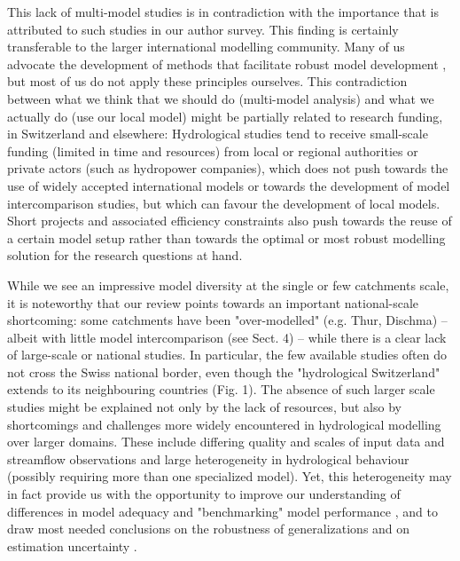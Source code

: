 \documentclass[10pt,a4paper]{article}
\begin{document}
This lack of multi-model studies is in contradiction with the importance that is attributed to such studies in our author survey. This finding is certainly transferable to the larger international modelling community. Many of us advocate the development of methods that facilitate robust model development \citep{Zheng2018}, but most of us do not apply these principles ourselves. This contradiction between what we think that we should do (multi-model analysis) and what we actually do (use our local model) might be partially related to research funding, in Switzerland and elsewhere: Hydrological studies tend to receive small-scale funding (limited in time and resources) from local or regional authorities or private actors (such as hydropower companies), which does not push towards the use of widely accepted international models or towards the development of model intercomparison studies, but which can favour the development of local models. Short projects and associated efficiency constraints also push towards the reuse of a certain model setup rather than towards the optimal or most robust modelling solution for the research questions at hand.

While we see an impressive model diversity at the single or few catchments scale, it is noteworthy that our review points towards an important national-scale shortcoming: some catchments have been "over-modelled" (e.g. Thur, Dischma) -- albeit with little model intercomparison (see Sect. 4) -- while there is a clear lack of large-scale or national studies. In particular, the few available studies often do not cross the Swiss national border, even though the "hydrological Switzerland" extends to its neighbouring countries (Fig. 1). The absence of such larger scale studies might be explained not only by the lack of resources, but also by shortcomings and challenges more widely encountered in hydrological modelling over larger domains. These include differing quality and scales of input data and streamflow observations and large heterogeneity in hydrological behaviour (possibly requiring more than one specialized model). Yet, this heterogeneity may in fact provide us with the opportunity to improve our understanding of differences in model adequacy and "benchmarking" model performance \citep{Newman2017, Seibert2018a, Lane2019}, and to draw most needed conclusions on the robustness of generalizations and on estimation uncertainty \citep{Gupta2014, McMillan2016}.
\end{document}
